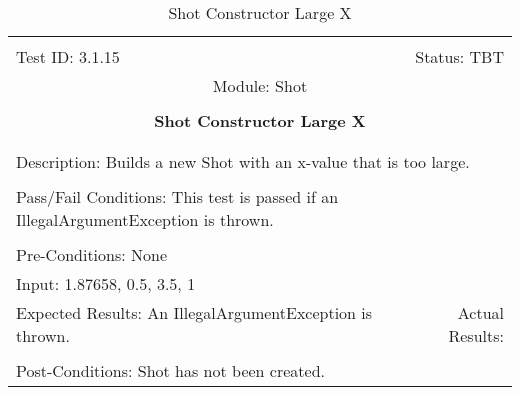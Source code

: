 \documentclass[titlepage]{article}
\begin{document}
\begin{center}%
\begin{table}
\begin{tabular}{|l r|}\hline&\\[-2mm]
	Test ID: 3.1.15	&Status: TBT\\[-3mm]
	\multicolumn{2}{|c|}{Module: Shot}\\&\\
	\multicolumn{2}{|c|}{\textbf{\large{Shot Constructor Large X}}}\\&\\\hline&\\[-3mm]
	\multicolumn{2}{|p{\textwidth}|}{Description: Builds a new Shot with an x-value that is too large.}\\[1mm]\hline&\\[-3mm]
	\multicolumn{2}{|p{\textwidth}|}{Pass/Fail Conditions: This test is passed if an IllegalArgumentException is thrown.}\\[1mm]\hline&\\[-3mm]
	\multicolumn{2}{|p{\textwidth}|}{Pre-Conditions: None}\\[4mm]
	\multicolumn{2}{|p{\textwidth}|}{Input: 1.87658, 0.5, 3.5, 1}\\[2mm]\hline
	\multicolumn{1}{|p{0.49\textwidth}}{Expected Results: An IllegalArgumentException is thrown.}	&\multicolumn{1}{|p{0.45\textwidth}|}{Actual Results: }\\\hline&\\[-3mm]
	\multicolumn{2}{|p{\textwidth}|}{Post-Conditions: Shot has not been created.}\\\hline
\end{tabular}
\caption{Shot Constructor Large X}
\end{table}
\end{center}
\end{document}

